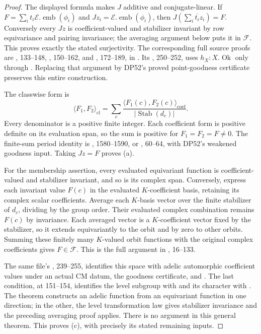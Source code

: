 \documentclass[11pt,a4paper]{article}
\theoremstyle{definition}\newtheorem{remark}[theorem]{Remark}
\begin{document}
\begin{proof}
The displayed formula makes $J$ additive and conjugate-linear.
If $F=\sum_i t_i\mathcal E.\operatorname{emb}(\phi_i)$ and
$Jz_i=\mathcal E.\operatorname{emb}(\phi_i)$, then
$J(\sum_i\overline{t_i}z_i)=F$.
Conversely every $Jz$ is coefficient-valued and stabilizer invariant by
row equivariance and pairing invariance; the averaging argument below
puts it in $\mathcal F$.
This proves exactly the stated surjectivity.
The corresponding full source proofs are
, 133--148,
, 150--162, and , 172--189,
in .
Its , 250--252, uses
$h_X:X.\operatorname{Ok}$ only through .
Replacing that argument by DP52's proved point-goodness certificate
preserves this entire construction.

The classwise form is
\[
 \langle F_1,F_2\rangle_{\mathrm{cl}}
 =\sum_c\frac{\langle F_1(c),F_2(c)\rangle_{\mathrm{coef}}}
                {|\operatorname{Stab}(d_c)|}.
\]
Every denominator is a positive finite integer.
Each coefficient form is positive definite on its evaluation span,
so the sum is positive for $F_1=F_2=F\ne0$.
The finite-sum period identity is
, 1580--1590, or
, 60--64, with DP52's weakened
goodness input.
Taking $Jz=F$ proves (a).

For the membership assertion, every evaluated equivariant function is
coefficient-valued and stabilizer invariant, and so is its complex span.
Conversely, express each invariant value $F(c)$ in the evaluated
$K$-coefficient basis, retaining its complex scalar coefficients.
Average each $K$-basis vector over the finite stabilizer of $d_c$,
dividing by the group order.
Their evaluated complex combination remains $F(c)$ by invariance.
Each averaged vector is a $K$-coefficient vector fixed by the stabilizer,
so it extends equivariantly to the orbit and by zero to other orbits.
Summing these finitely many $K$-valued orbit functions with the original
complex coefficients gives $F\in\mathcal F$.
This is the full argument in , 16--133.

The same file's , 239--255, identifies this space with
adelic automorphic coefficient values under an actual CM datum,
the goodness certificate,  and .
The last condition, at 151--154, identifies the level subgroup with
 and its character with .
The theorem constructs an adelic function from an equivariant function
in one direction; in the other, the level transformation law gives
stabilizer invariance and the preceding averaging proof applies.
There is no  argument in this general theorem.
This proves (c), with precisely its stated remaining inputs.


\end{proof}
\end{document}
